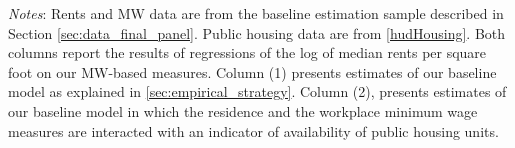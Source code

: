 \begin{table}[hbt!]
    \begin{minipage}{.95\textwidth} \footnotesize
        \vspace{2mm}
        \textit{Notes}: 
        Rents and MW data are from the baseline estimation sample described in Section 
        \ref{sec:data_final_panel}. Public housing data are from \ref{hudHousing}.
        Both columns report the results of regressions of the log of 
        median rents per square foot on our MW-based measures.
        Column (1) presents estimates of our baseline model as explained in 
        \ref{sec:empirical_strategy}.
        Column (2), presents estimates of our baseline model in which the residence and 
        the workplace minimum wage measures are interacted with an indicator of availability 
        of public housing units.
    \end{minipage}
\end{table}
